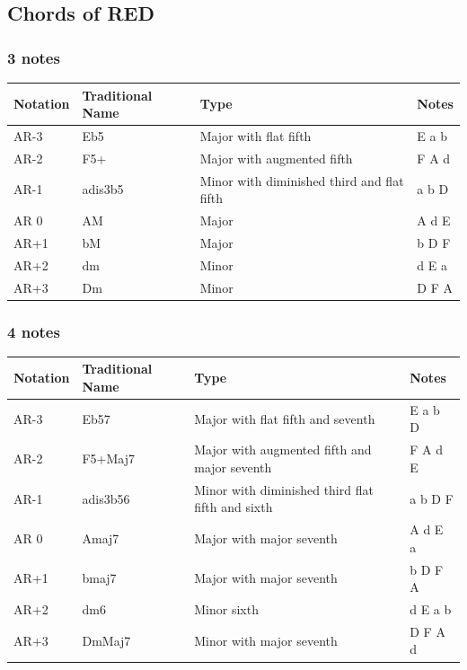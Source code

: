 \documentclass[]{report}
\begin{document}
\subsection*{Chords of RED}
\subsubsection*{3 notes}
\begin{table}[H]
\centering
\begin{tabularx}{\textwidth}{ll>{\raggedright\arraybackslash}Xl}
\toprule
Notation & Traditional Name & Type & Notes \\
\midrule
\textsf{AR-3} & Eb5 & Major with flat fifth & E a b \\
\textsf{AR-2} & F5+ & Major with augmented fifth & F A d \\
\textsf{AR-1} & adis3b5 & Minor with diminished third and flat fifth & a b D \\
\textsf{AR 0} & AM & Major & A d E \\
\textsf{AR+1} & bM & Major & b D F \\
\textsf{AR+2} & dm & Minor & d E a \\
\textsf{AR+3} & Dm & Minor & D F A \\
\bottomrule
\end{tabularx}
\end{table}
\subsubsection*{4 notes}
\begin{table}[H]
\centering
\begin{tabularx}{\textwidth}{ll>{\raggedright\arraybackslash}Xl}
\toprule
Notation & Traditional Name & Type & Notes \\
\midrule
\textsf{AR-3} & Eb57 & Major with flat fifth and seventh & E a b D \\
\textsf{AR-2} & F5+Maj7 & Major with augmented fifth and major seventh & F A d E \\
\textsf{AR-1} & adis3b56 & Minor with diminished third flat fifth and sixth & a b D F \\
\textsf{AR 0} & Amaj7 & Major with major seventh & A d E a \\
\textsf{AR+1} & bmaj7 & Major with major seventh & b D F A \\
\textsf{AR+2} & dm6 & Minor sixth & d E a b \\
\textsf{AR+3} & DmMaj7 & Minor with major seventh & D F A d \\
\bottomrule
\end{tabularx}
\end{table}
\end{document}
